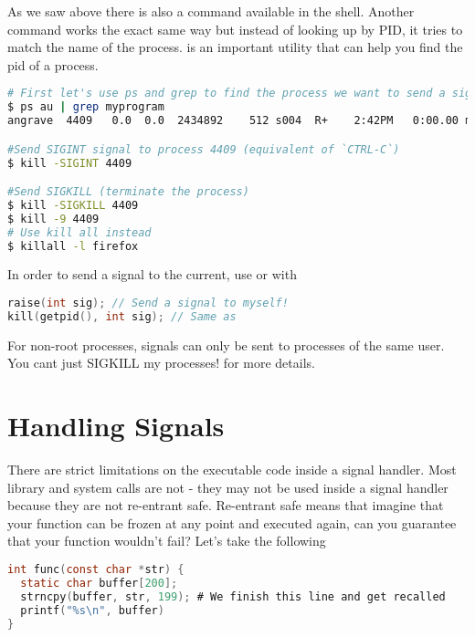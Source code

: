 As we saw above there is also a  command available in the shell. Another command  works the exact same way but instead of looking up by PID, it tries to match the name of the process.  is an important utility that can help you find the pid of a process.

\begin{lstlisting}[language=bash]
# First let's use ps and grep to find the process we want to send a signal to
$ ps au | grep myprogram
angrave  4409   0.0  0.0  2434892    512 s004  R+    2:42PM   0:00.00 myprogram 1 2 3

#Send SIGINT signal to process 4409 (equivalent of `CTRL-C`)
$ kill -SIGINT 4409

#Send SIGKILL (terminate the process)
$ kill -SIGKILL 4409
$ kill -9 4409
# Use kill all instead
$ killall -l firefox
\end{lstlisting}

In order to send a signal to the current, use  or  with 

\begin{lstlisting}[language=C]
raise(int sig); // Send a signal to myself!
kill(getpid(), int sig); // Same as
\end{lstlisting}

For non-root processes, signals can only be sent to processes of the same user. You cant just SIGKILL my processes!  for more details.


\section{Handling Signals}

There are strict limitations on the executable code inside a signal handler. Most library and system calls are not  - they may not be used inside a signal handler because they are not re-entrant safe. Re-entrant safe means that imagine that your function can be frozen at any point and executed again, can you guarantee that your function wouldn't fail? Let's take the following

\begin{lstlisting}[language=C]
int func(const char *str) {
  static char buffer[200];
  strncpy(buffer, str, 199); # We finish this line and get recalled
  printf("%s\n", buffer)
}
\end{lstlisting}

